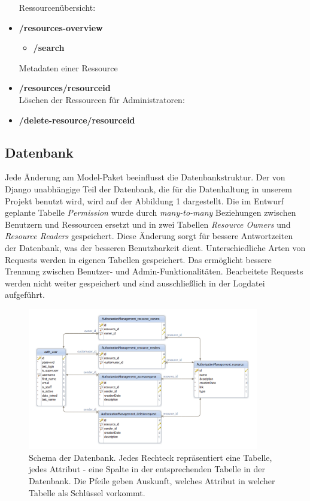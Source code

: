 \documentclass[parskip=full,11pt]{scrartcl}
\begin{document}
\begin{itemize}[itemsep=0pt]
\noindent Ressourcenübersicht:
\item \textbf{/resources-overview}
	\begin{itemize}
	\item \textbf{/search}\\
	\end{itemize}
	
\noindent Metadaten einer Ressource
\item \textbf{/resources/resourceid}\\

\noindent Löschen der Ressourcen für Administratoren:
\item \textbf{/delete-resource/resourceid}
\end{itemize}
 
\newpage 
\subsection{Datenbank}
Jede Änderung am Model-Paket beeinflusst die Datenbankstruktur. Der von Django unabhängige Teil der Datenbank, die für die Datenhaltung in unserem Projekt benutzt wird, wird auf der Abbildung 1 dargestellt. Die im Entwurf geplante Tabelle \textit{Permission} wurde durch \textit{many-to-many} Beziehungen zwischen Benutzern und Ressourcen ersetzt und in zwei Tabellen \textit{Resource Owners} und \textit{Resource Readers} gespeichert. Diese Änderung sorgt für bessere Antwortzeiten der Datenbank, was der besseren Benutzbarkeit dient.
Unterschiedliche Arten von Requests werden in eigenen Tabellen gespeichert. Das ermöglicht bessere Trennung zwischen Benutzer- und Admin-Funktionalitäten. Bearbeitete Requests werden nicht weiter gespeichert und sind ausschließlich in der Logdatei aufgeführt.    
 \begin{figure}[ht!]
 	\centering
 	\includegraphics[width=0.9\textwidth]{res/database.png}
 	\caption{Schema der Datenbank. Jedes Rechteck repräsentiert eine Tabelle,
jedes Attribut - eine Spalte in der entsprechenden Tabelle in der Datenbank. Die
Pfeile geben Auskunft, welches Attribut in welcher Tabelle als Schlüssel vorkommt.}
 \end{figure}
\end{document}
